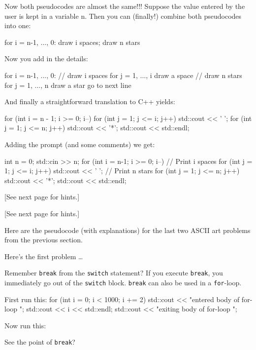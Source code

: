\begin{console}
Now both pseudocodes are almost the same!!! Suppose the value entered by
the user is kept in a variable n. Then you can (finally!) combine both
pseudocodes into one:
\begin{console}
for i = n-1, ..., 0:
        draw i spaces; draw n stars
\end{console}

Now you add in the details:
\begin{console}
for i = n-1, ..., 0:
      // draw i spaces
      for j = 1, ..., i
          draw a space
      // draw n stars
      for j = 1, ..., n
          draw a star
      go to next line
\end{console}

And finally a straightforward translation to C++ yields:
\begin{console}
for (int i = n - 1; i >= 0; i--)
{   
    for (int j = 1; j <= i; j++)
    {
        std::cout << ' ';
    }
    for (int j = 1; j <= n; j++)
    {
        std::cout << '*';
    }
    std::cout << std::endl;
}
\end{console}
Adding the prompt (and some comments) we get:
\begin{console}
int n = 0;
std::cin >> n;
for (int i = n-1; i >= 0; i--)
{   
    // Print i spaces
    for (int j = 1; j <= i; j++)
    {
        std::cout << ' ';
    }
    // Print n stars
    for (int j = 1; j <= n; j++)
    {
        std::cout << '*';
    }
    std::cout << std::endl;
}
\end{console}

[See next page for hints.]

[See next page for hints.]

\newpage{}

Here are the pseudocode (with explanations) for the last two ASCII art problems from the previous section.

Here's the first problem \ldots

\newpage{}

Remember \texttt{break} from the \texttt{switch} statement? If you execute
\texttt{break}, you immediately go out of the \texttt{switch} block.
\texttt{break} can also be used in a \texttt{for}-loop.
\begin{console}
First run this:
for (int i = 0; i < 1000; i += 2)
{
std::cout << "entered body of for-loop \n";
std::cout << i << std::endl;
std::cout << "exiting body of for-loop \n";
} 
\end{console}
Now run this:
See the point of \texttt{break}?


\end{console}
